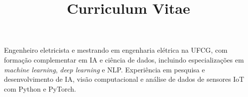 \documentclass[a4paper,skipsamekey,11pt,brazilian]{curve}
\title{Curriculum Vitae}
\begin{document}
\makeheaders[c]

\smallskip
{\small\noindent
Engenheiro eletricista e mestrando em engenharia elétrica na UFCG, com formação complementar em IA e ciência de dados, incluindo especializações em \textit{machine learning}, \textit{deep learning} e NLP. Experiência em pesquisa e desenvolvimento de IA, visão computacional e análise de dados de sensores IoT com Python e PyTorch.
\par
}


\newpage



\newpage


\end{document}
